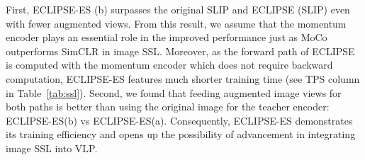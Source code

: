 First, ECLIPSE-ES (b) surpasses the original SLIP and ECLIPSE (SLIP) even with fewer augmented views.
From this result, we assume that the momentum encoder plays an essential role in the improved performance just as MoCo outperforms SimCLR in image SSL.
Moreover, as the forward path of ECLIPSE is computed with the momentum encoder which does not require backward computation, ECLIPSE-ES features much shorter training time (see TPS column in Table~\ref{tab:ssl}).
Second, we found that feeding augmented image views for both paths is better than using the original image for the teacher encoder: ECLIPSE-ES(b) vs ECLIPSE-ES(a).
Consequently, ECLIPSE-ES demonstrates its training efficiency and opens up the possibility of advancement in integrating image SSL into VLP.

